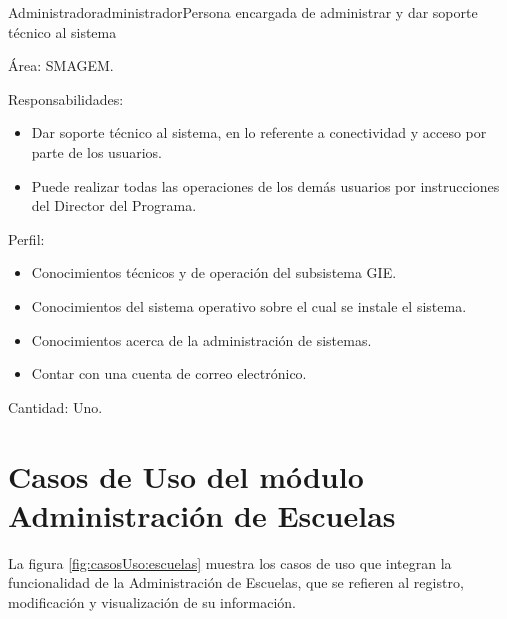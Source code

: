 \begin{actor}{Administrador}{administrador}{Persona encargada de administrar y dar soporte técnico al sistema}
    \item[Área:] SMAGEM.
    \item[Responsabilidades:] \hspace{1pt}
    \begin{itemize}
	\item Dar soporte técnico al sistema, en lo referente a conectividad y acceso por parte de los usuarios.
	\item Puede realizar todas las operaciones de los demás usuarios por instrucciones del Director del Programa.
    \end{itemize}
    \item[Perfil:] \hspace{1pt}
    \begin{itemize}
	\item Conocimientos técnicos y de operación del subsistema GIE.
	\item Conocimientos del sistema operativo sobre el cual se instale el sistema.
	\item Conocimientos acerca de la administración de sistemas.
	\item Contar con una cuenta de correo electrónico.
    \end{itemize}
    \item[Cantidad:] Uno.
\end{actor}


\section{Casos de Uso del módulo Administración de Escuelas}
La figura \ref{fig:casosUso:escuelas} muestra los casos de uso que integran la funcionalidad de la Administración de Escuelas, que se refieren al registro, modificación y visualización de su información.


